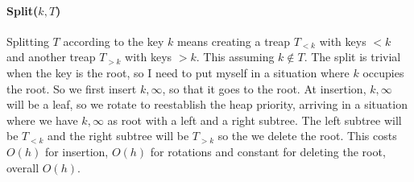 \documentclass[10pt]{report}
\begin{document}
\paragraph{Split($k, T$)} Splitting $T$ according to the key $k$ means creating a treap $T_{<k}$ with keys $< k$ and another treap $T_{>k}$ with keys $> k$. This assuming $k\not\in T$. The split is trivial when the key is the root, so I need to put myself in a situation where $k$ occupies the root. So we first insert $k,\infty$, so that it goes to the root. At insertion, $k,\infty$ will be a leaf, so we rotate to reestablish the heap priority, arriving in a situation where we have $k,\infty$ as root with a left and a right subtree. The left subtree will be $T_{<k}$ and the right subtree will be $T_{>k}$ so the we delete the root. This costs $O(h)$ for insertion, $O(h)$ for rotations and constant for deleting the root, overall $O(h)$.
\end{document}
